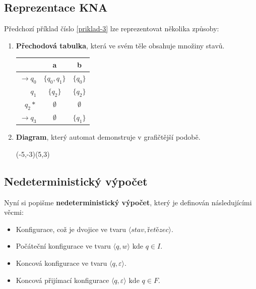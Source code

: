 \documentclass[10pt, a4paper, titlepage]{article}
\theoremstyle{note}
\begin{document}
\subsection{Reprezentace KNA}
Předchozí příklad číslo \ref{priklad-3} lze reprezentovat několika způsoby:
\begin{enumerate}
\item
\textbf{Přechodová tabulka}, která ve svém těle obsahuje množiny stavů.

\begin{center}
\begin{tabular}{ r || c | c }                   
   & a & b \\
   \hline
   $ \rightarrow q_{0} $ & $ \lbrace q_{0},q_{1} \rbrace $ & $ \lbrace q_{0} \rbrace $ \\
   $ q_{1} $ & $ \lbrace q_{2} \rbrace $ & $ \lbrace q_{2} \rbrace $ \\
   $ q_{2} * $ & $ \emptyset $ & $ \emptyset $ \\
   $ \rightarrow q_{3} $ & $ \emptyset $ & $ \lbrace q_{1} \rbrace $ \\ 
\end{tabular}
\end{center}

\item
\textbf{Diagram}, který automat demonstruje v grafičtější podobě.

\begin{center}
\begin{VCPicture}{(-5,-3)(5,3)}
\end{VCPicture}
\end{center}


\end{enumerate}

\subsection{Nedeterministický výpočet}
Nyní si popišme \textbf{nedeterministický výpočet}, který je definován následujícími věcmi:
\begin{itemize}
\item
Konfigurace, což je dvojice ve tvaru $\langle \textit{stav}, \textit{řetězec} \rangle $.
\item
Počáteční konfigurace ve tvaru $\langle q, w \rangle \text{ kde } q \in I$.
\item
Koncová konfigurace ve tvaru $\langle q, \varepsilon \rangle $.
\item
Koncová přijímací konfigurace $\langle q, \varepsilon \rangle \text{ kde } q \in F$.
\end{itemize}
\end{document}
